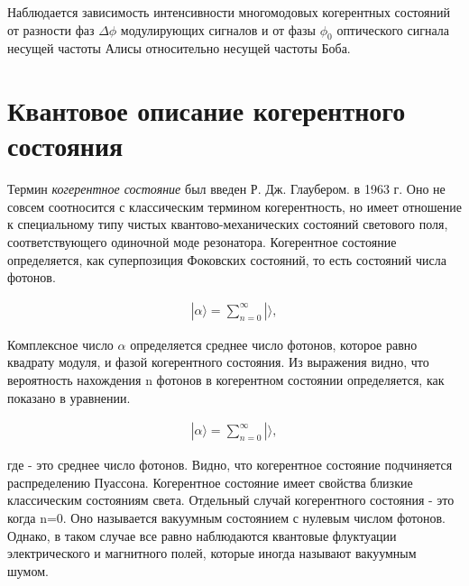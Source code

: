 Наблюдается зависимость интенсивности многомодовых когерентных состояний от разности фаз $\Delta\phi$ модулирующих сигналов и от фазы $\phi_0$ оптического сигнала несущей частоты Алисы относительно несущей частоты Боба.

\section{Квантовое описание когерентного состояния} \label{sec:ch4/sec3}
Термин \textit{когерентное состояние} был введен Р. Дж. Глаубером. в 1963 г. Оно не совсем соотносится с классическим термином когерентность, но имеет отношение к специальному типу чистых квантово-механических состояний светового поля, соответствующего одиночной моде резонатора. Когерентное состояние определяется, как суперпозиция Фоковских состояний, то есть состояний числа фотонов. 


\begin{equation}
	\begin{aligned}
		|\alpha \rangle = \sum_{n=0}^\infty   |  \rangle,
	\end{aligned}
\end{equation}

Комплексное число $ \alpha $	определяется среднее число фотонов, которое равно квадрату модуля, и фазой когерентного состояния. Из выражения видно, что вероятность нахождения n фотонов в когерентном состоянии определяется, как показано в уравнении. 

\begin{equation}
	\begin{aligned}
		|\alpha \rangle = \sum_{n=0}^\infty   |  \rangle,
	\end{aligned}
\end{equation}

где - это среднее число фотонов. Видно, что когерентное состояние подчиняется распределению Пуассона. Когерентное состояние имеет свойства близкие классическим состояниям света. Отдельный случай когерентного состояния - это когда n=0. Оно называется вакуумным состоянием с нулевым числом фотонов. Однако, в таком случае все равно наблюдаются квантовые флуктуации электрического и магнитного полей, которые иногда называют вакуумным шумом. 



